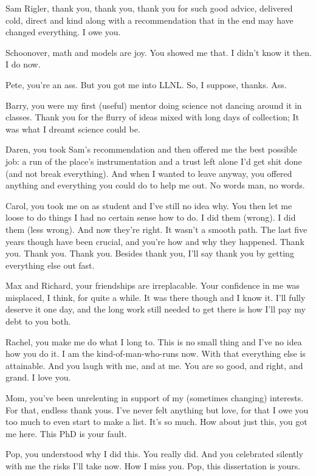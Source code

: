 \begin{acknowledgements}

Sam Rigler, thank you, thank you, thank you for such good advice, delivered cold, direct and kind along with a recommendation that in the end may have changed everything.  I owe you.

Schoonover, math and models are joy.  You showed me that.  I didn't know it then.  I do now.

Pete, you're an ass.  But you got me into LLNL.  So, I suppose, thanks.  Ass.

Barry, you were my first (useful) mentor doing science not dancing around it in classes.  Thank you for the flurry of ideas mixed with long days of collection; It was what I dreamt science could be.

Daren, you took Sam's recommendation and then offered me the best possible job: a run of the place's instrumentation and a trust left alone I'd get shit done (and not break everything).  And when I wanted to leave anyway, you offered anything and everything you could do to help me out.  No words man, no words.

Carol, you took me on as student and I've still no idea why. You then let me loose to do things I had no certain sense how to do. I did them (wrong). I did them (less wrong). And now they're right. It wasn't a smooth path. The last five years though have been crucial, and you're how and why they happened. Thank you. Thank you. Thank you. Besides thank you, I'll say thank you by getting everything else out fast.

Max and Richard, your friendships are irreplacable.  Your confidence in me was misplaced, I think, for quite a while.  It was there though and I know it.  I'll fully deserve it one day, and the long work still needed to get there is how I'll pay my debt to you both.

Rachel, you make me do what I long to.  This is no small thing and I've no idea how you do it.  I am the kind-of-man-who-runs now.  With that everything else is attainable.  And you laugh with me, and at me.  You are so good, and right, and   grand.  I love you.

Mom, you've been unrelenting in support of my (sometimes changing) interests.  For that, endless thank yous.  I've never felt anything but love, for that I owe you too much to even start to make a list.  It's so much.  How about just this, you got me here.  This PhD is your fault.

Pop, you understood why I did this.  You really did. And you celebrated silently with me the risks I'll take now.  How I miss you.  Pop, this dissertation is yours.

\end{acknowledgements}